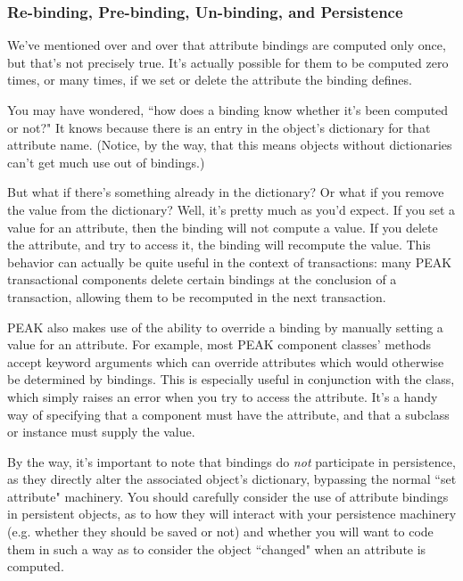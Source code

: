 \subsubsection{Re-binding, Pre-binding, Un-binding, and Persistence}

We've mentioned over and over that attribute bindings are computed only once,
but that's not precisely true.  It's actually possible for them to be computed
zero times, or many times, if we set or delete the attribute the binding
defines.

You may have wondered, ``how does a binding know whether it's been computed or
not?"  It knows because there is an entry in the object's dictionary for that
attribute name.  (Notice, by the way, that this means objects without
dictionaries can't get much use out of bindings.)

But what if there's something already in the dictionary?  Or what if you remove
the value from the dictionary?  Well, it's pretty much as you'd expect.  If you
set a value for an attribute, then the binding will not compute a value.  If
you delete the attribute, and try to access it, the binding will recompute the
value.  This behavior can actually be quite useful in the context of 
transactions: many PEAK transactional components delete certain bindings at the
conclusion of a transaction, allowing them to be recomputed in the next
transaction.

PEAK also makes use of the ability to override a binding by manually setting
a value for an attribute.  For example, most PEAK component classes'
 methods accept keyword arguments which can override attributes
which would otherwise be determined by bindings.  This is especially useful in
conjunction with the  class, which simply
raises an error when you try to access the attribute.  It's a handy way of
specifying that a component must have the attribute, and that a subclass or
instance must supply the value.

By the way, it's important to note that bindings do \emph{not} participate in
persistence, as they directly alter the associated object's dictionary,
bypassing the normal ``set attribute" machinery.  You should carefully
consider the use of attribute bindings in persistent objects, as to how they
will interact with your persistence machinery (e.g. whether they should be
saved or not) and whether you will want to code them in such a way as to
consider the object ``changed" when an attribute is computed.




